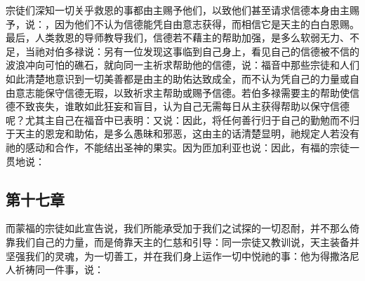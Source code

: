 宗徒们深知一切关乎救恩的事都由主赐予他们，以致他们甚至请求信德本身由主赐予，说：，因为他们不认为信德能凭自由意志获得，而相信它是天主的白白恩赐。最后，人类救恩的导师教导我们，信德若不藉主的帮助加强，是多么软弱无力、不足，当祂对伯多禄说：另有一位发现这事临到自己身上，看见自己的信德被不信的波浪冲向可怕的礁石，就向同一主祈求帮助他的信德，说：福音中那些宗徒和人们如此清楚地意识到一切美善都是由主的助佑达致成全，而不认为凭自己的力量或自由意志能保守信德无瑕，以致祈求主帮助或赐予信德。若伯多禄需要主的帮助使信德不致丧失，谁敢如此狂妄和盲目，认为自己无需每日从主获得帮助以保守信德呢？尤其主自己在福音中已表明：又说：因此，将任何善行归于自己的勤勉而不归于天主的恩宠和助佑，是多么愚昧和邪恶，这由主的话清楚显明，祂规定人若没有祂的感动和合作，不能结出圣神的果实。因为匝加利亚也说：因此，有福的宗徒一贯地说：\par


\subsection{第十七章}

\par

而蒙福的宗徒如此宣告说，我们所能承受加于我们之试探的一切忍耐，并不那么倚靠我们自己的力量，而是倚靠天主的仁慈和引导：同一宗徒又教训说，天主装备并坚强我们的灵魂，为一切善工，并在我们身上运作一切中悦祂的事：他为得撒洛尼人祈祷同一件事，说：\par

